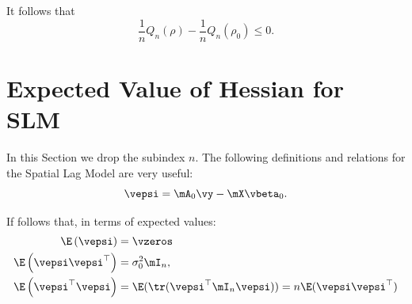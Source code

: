\begin{subappendices}
It follows that 
\begin{equation*}
\frac{1}{n}Q_n(\rho) - \frac{1}{n}Q_n(\rho_0) \leq 0.
\end{equation*}








 \section{Expected Value of Hessian for SLM}\label{appendix-EH-sml}

In this Section we drop the subindex $n$. The following definitions and relations for the Spatial Lag Model are very useful:
\begin{equation*}
	\vepsi  =  \mA_0\vy - \mX\vbeta_0. 
\end{equation*}

If follows that, in terms of expected values:
\begin{align*}
	\E\left(\vepsi\right)      & = \vzeros \\
	\E\left(\vepsi\vepsi^\top\right) &= \sigma^2_0\mI_n, \\
	\E\left(\vepsi^\top\vepsi\right) &= \E(\tr(\vepsi^\top\mI_n\vepsi)) = n\E(\vepsi\vepsi^\top)
\end{align*}


\end{subappendices}
